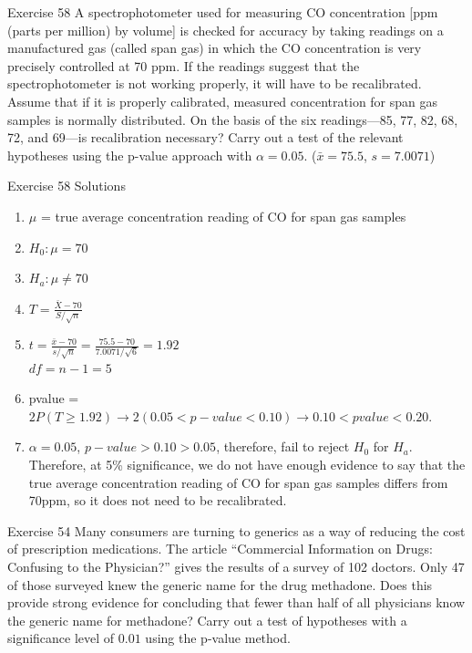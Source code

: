 \documentclass[
  ignorenonframetext,
]{beamer}
\providecommand{\tightlist}{%
  \setlength{\itemsep}{0pt}\setlength{\parskip}{0pt}}\usepackage{longtable,booktabs,array}
\begin{document}
\begin{frame}{Exercise 58}
\protect\hypertarget{exercise-58}{}
A spectrophotometer used for measuring CO concentration {[}ppm (parts
per million) by volume{]} is checked for accuracy by taking readings on
a manufactured gas (called span gas) in which the CO concentration is
very precisely controlled at 70 ppm. If the readings suggest that the
spectrophotometer is not working properly, it will have to be
recalibrated. Assume that if it is properly calibrated, measured
concentration for span gas samples is normally distributed. On the basis
of the six readings---85, 77, 82, 68, 72, and 69---is recalibration
necessary? Carry out a test of the relevant hypotheses using the p-value
approach with \(\alpha = 0.05\). (\(\bar{x} = 75.5\), \(s = 7.0071\))
\end{frame}

\begin{frame}{Exercise 58 Solutions}
\protect\hypertarget{exercise-58-solutions}{}
\begin{enumerate}[<+->]
\tightlist
\item
  \(\mu\) = true average concentration reading of CO for span gas
  samples
\item
  \(H_{0}: \mu = 70\)
\item
  \(H_{a}: \mu \neq 70\)
\item
  \(T = \frac{\bar{X} - 70}{S/\sqrt{n}}\)
\item
  \(t = \frac{\bar{x} - 70}{s/\sqrt{n}} = \frac{75.5 - 70}{7.0071/\sqrt{6}} = 1.92\)\\
  \(df = n-1 = 5\)
\item
  pvalue =
  \(2P(T \geq 1.92) \rightarrow 2(0.05 < p-value < 0.10) \rightarrow 0.10 < pvalue < 0.20\).
\item
  \(\alpha = 0.05\), \(p-value > 0.10 > 0.05\), therefore, fail to
  reject \(H_{0}\) for \(H_{a}\). Therefore, at 5\% significance, we do
  not have enough evidence to say that the true average concentration
  reading of CO for span gas samples differs from 70ppm, so it does not
  need to be recalibrated.
\end{enumerate}
\end{frame}

\begin{frame}{Exercise 54}
\protect\hypertarget{exercise-54}{}
Many consumers are turning to generics as a way of reducing the cost of
prescription medications. The article ``Commercial Information on Drugs:
Confusing to the Physician?'' gives the results of a survey of 102
doctors. Only 47 of those surveyed knew the generic name for the drug
methadone. Does this provide strong evidence for concluding that fewer
than half of all physicians know the generic name for methadone? Carry
out a test of hypotheses with a significance level of \(0.01\) using the
p-value method.
\end{frame}
\end{document}
